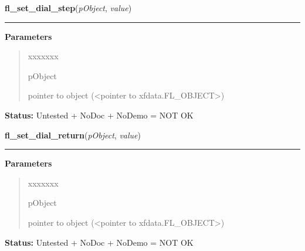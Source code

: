 \hspace{.8\funcindent}\begin{boxedminipage}{\funcwidth}

    \raggedright \textbf{fl\_set\_dial\_step}(\textit{pObject}, \textit{value})

    \vspace{-1.5ex}

    \rule{\textwidth}{0.5\fboxrule}
\setlength{\parskip}{2ex}
\setlength{\parskip}{1ex}
      \textbf{Parameters}
      \vspace{-1ex}

      \begin{quote}
        \begin{Ventry}{xxxxxxx}

          \item[pObject]

          pointer to object ({\textless}pointer to 
          xfdata.FL\_OBJECT{\textgreater})

        \end{Ventry}

      \end{quote}

\textbf{Status:} Untested + NoDoc + NoDemo = NOT OK



    \end{boxedminipage}

    \label{xformslib:library:fl_set_dial_return}

    \vspace{0.5ex}

\hspace{.8\funcindent}\begin{boxedminipage}{\funcwidth}

    \raggedright \textbf{fl\_set\_dial\_return}(\textit{pObject}, \textit{value})

    \vspace{-1.5ex}

    \rule{\textwidth}{0.5\fboxrule}
\setlength{\parskip}{2ex}
\setlength{\parskip}{1ex}
      \textbf{Parameters}
      \vspace{-1ex}

      \begin{quote}
        \begin{Ventry}{xxxxxxx}

          \item[pObject]

          pointer to object ({\textless}pointer to 
          xfdata.FL\_OBJECT{\textgreater})

        \end{Ventry}

      \end{quote}

\textbf{Status:} Untested + NoDoc + NoDemo = NOT OK



    \end{boxedminipage}

